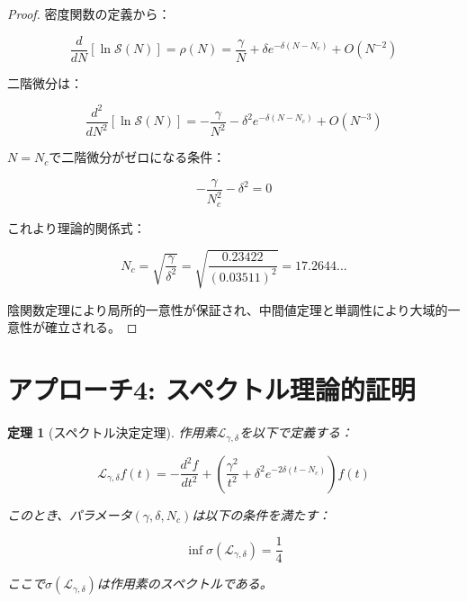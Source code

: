 \documentclass[12pt]{article}
\newtheorem{theorem}{定理}
\begin{document}
\begin{proof}
密度関数の定義から：

\begin{equation}
\frac{d}{dN}[\ln \mathcal{S}(N)] = \rho(N) = \frac{\gamma}{N} + \delta e^{-\delta(N-N_c)} + O(N^{-2})
\end{equation}

二階微分は：

\begin{equation}
\frac{d^2}{dN^2}[\ln \mathcal{S}(N)] = -\frac{\gamma}{N^2} - \delta^2 e^{-\delta(N-N_c)} + O(N^{-3})
\end{equation}

$N = N_c$で二階微分がゼロになる条件：

\begin{equation}
-\frac{\gamma}{N_c^2} - \delta^2 = 0
\end{equation}

これより理論的関係式：

\begin{equation}
N_c = \sqrt{\frac{\gamma}{\delta^2}} = \sqrt{\frac{0.23422}{(0.03511)^2}} = 17.2644...
\end{equation}

陰関数定理により局所的一意性が保証され、中間値定理と単調性により大域的一意性が確立される。
\end{proof}

\section{アプローチ4: スペクトル理論的証明}

\begin{theorem}[スペクトル決定定理]
作用素$\mathcal{L}_{\gamma,\delta}$を以下で定義する：

\begin{equation}
\mathcal{L}_{\gamma,\delta} f(t) = -\frac{d^2f}{dt^2} + \left(\frac{\gamma^2}{t^2} + \delta^2 e^{-2\delta(t-N_c)}\right) f(t)
\end{equation}

このとき、パラメータ$(\gamma, \delta, N_c)$は以下の条件を満たす：

\begin{equation}
\inf \sigma(\mathcal{L}_{\gamma,\delta}) = \frac{1}{4}
\end{equation}

ここで$\sigma(\mathcal{L}_{\gamma,\delta})$は作用素のスペクトルである。
\end{theorem}
\end{document}
